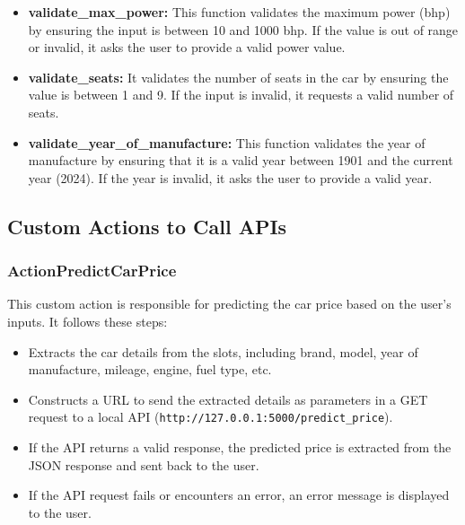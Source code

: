 \documentclass[a4paper,12pt]{article}
\begin{document}
\begin{itemize}
	\item \textbf{validate\_max\_power:} 
	This function validates the maximum power (bhp) by ensuring the input is between 10 and 1000 bhp. If the value is out of range or invalid, it asks the user to provide a valid power value.
	
	\item \textbf{validate\_seats:} 
	It validates the number of seats in the car by ensuring the value is between 1 and 9. If the input is invalid, it requests a valid number of seats.
	
	\item \textbf{validate\_year\_of\_manufacture:} 
	This function validates the year of manufacture by ensuring that it is a valid year between 1901 and the current year (2024). If the year is invalid, it asks the user to provide a valid year.
\end{itemize}


\subsection{Custom Actions to Call APIs}

\subsubsection{ActionPredictCarPrice}
This custom action is responsible for predicting the car price based on the user's inputs. It follows these steps:
\begin{itemize}
	\item Extracts the car details from the slots, including brand, model, year of manufacture, mileage, engine, fuel type, etc.
	\item Constructs a URL to send the extracted details as parameters in a GET request to a local API (\texttt{http://127.0.0.1:5000/predict\_price}).
	\item If the API returns a valid response, the predicted price is extracted from the JSON response and sent back to the user.
	\item If the API request fails or encounters an error, an error message is displayed to the user.
\end{itemize}
\end{document}
